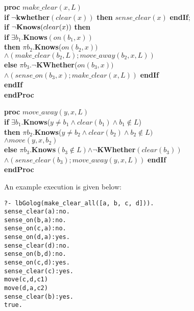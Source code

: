 \documentclass[letterpaper]{article}
\newcommand{\Knows}{\mbox{\bf Knows}}
\begin{document}
\noindent\textbf{proc} $make\_clear(x, L)$\\
\noindent\textbf{if} $\neg$\textbf{kwhether}$(clear(x))$ \textbf{then} $sense\_clear(x)$ \textbf{endIf};\\
\noindent\textbf{if} $\neg\Knows(clear(x))$ \textbf{then} \\
\hspace*{0.5cm}\textbf{if} $\exists b_1$.\Knows$(on(b_1, x))$\\
			\hspace*{0.5cm}\textbf{then}  $\pi b_2$.\Knows($on(b_2, x))$\\
\hspace*{1.5cm}$\wedge$$(make\_clear(b_2, L) ; move\_away(b_2, x, L))$\\
\hspace*{0.4cm} \textbf{else} $\pi b_3$.$\neg$\textbf{KWhether}($on(b_3, x))$\\
\hspace*{1.5cm}$\wedge$$(sense\_on(b_3, x) ; make\_clear(x, L)
			)
		$ \textbf{endIf}\\
\noindent \textbf{endIf}\\
\textbf{endProc}

\vspace{.1cm}

\noindent \textbf{proc} $move\_away(y, x, L)$\\
\noindent \textbf{if} $\exists$$b_1$.\Knows($y \neq b_1 \wedge clear(b_1) \wedge b_1\not\in L$)\\
\noindent \textbf{then} $\pi$$b_2.$\Knows($y \neq b_2 \wedge clear(b_2) \wedge b_2\not\in L)$\\
\hspace*{1.3cm}$\wedge$$move(y, x, b_2)$\\
\noindent\textbf{else} $\pi$$b_3$.\Knows$(b_3 \not\in L)$$\wedge$$\neg$\textbf{KWhether}$(clear(b_3))$\\
\hspace*{1.3cm}$\wedge$$(sense\_clear(b_3) ; move\_away(y, x, L))$ \textbf{endIf}\\
\noindent \textbf{endProc}

An example execution is given below:
\begin{verbatim}
?- lbGolog(make_clear_all([a, b, c, d])).
sense_clear(a):no.
sense_on(b,a):no.
sense_on(c,a):no.
sense_on(d,a):yes.
sense_clear(d):no.
sense_on(b,d):no.
sense_on(c,d):yes.
sense_clear(c):yes.
move(c,d,c1)
move(d,a,c2)
sense_clear(b):yes.
true.
\end{verbatim}
\end{document}
